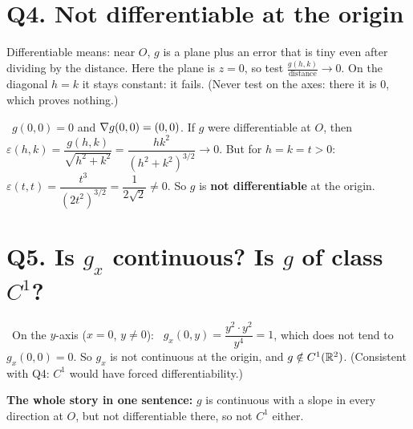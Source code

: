 \section{Q4. Not differentiable at the origin}

\begin{idea}
Differentiable means: near $O$, $g$ is a plane plus an error that is tiny even after dividing by the
distance. Here the plane is $z=0$, so test $\frac{g(h,k)}{\text{distance}}\to0$. On the diagonal $h=k$ it stays constant: it fails.
(Never test on the axes: there it is $0$, which proves nothing.)
\end{idea}

\begin{writethis}
 \ $g(0,0)=0$ and $\nabla g(0,0)=(0,0)$. If $g$ were differentiable at $O$, then
$\varepsilon(h,k)=\dfrac{g(h,k)}{\sqrt{h^2+k^2}}=\dfrac{hk^2}{(h^2+k^2)^{3/2}}\to0$.
But for $h=k=t>0$: \ $\varepsilon(t,t)=\dfrac{t^3}{(2t^2)^{3/2}}=\dfrac{1}{2\sqrt2}\ne0$.
So $g$ is \textbf{not differentiable} at the origin.
\end{writethis}



\section{Q5. Is $g_x$ continuous? Is $g$ of class $C^1$?}

\begin{writethis}
 \ On the $y$-axis ($x=0$, $y\ne0$): \ $g_x(0,y)=\dfrac{y^2\cdot y^2}{y^4}=1$, which does not tend to
$g_x(0,0)=0$. So $g_x$ is not continuous at the origin, and $g\notin C^1(\mathbb{R}^2)$.
(Consistent with Q4: $C^1$ would have forced differentiability.)

\smallskip\textbf{The whole story in one sentence:} $g$ is continuous with a slope in every direction at $O$,
but not differentiable there, so not $C^1$ either.
\end{writethis}


